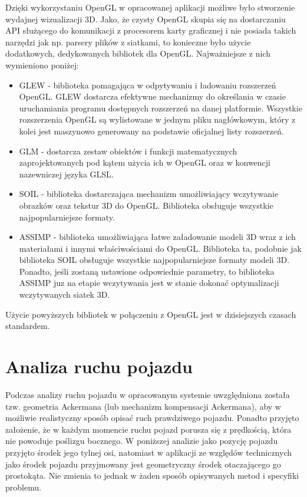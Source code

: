 \documentclass[a4paper,11pt,twoside]{report}
\theoremstyle{definition}
\begin{document}
Dzięki wykorzystaniu OpenGL w opracowanej aplikacji możliwe było stworzenie wydajnej wizualizacji 3D. Jako, że czysty OpenGL skupia się na dostarczaniu API służącego do komunikacji z procesorem karty graficznej i nie posiada takich narzędzi jak np. parsery plików z siatkami, to konieczne było użycie dodatkowych, dedykowanych bibliotek dla OpenGL. Najważniejsze z nich wymieniono poniżej:
\begin{itemize}
	\item GLEW - biblioteka pomagająca w odpytywaniu i ładowaniu rozszerzeń OpenGL. GLEW dostarcza efektywne mechanizmy do określania w czasie uruchamiania programu dostępnych rozszerzeń na danej platformie. Wszystkie rozszerzenia OpenGL są wylistowane w jednym pliku nagłówkowym, który z kolei jest maszynowo generowany na podstawie oficjalnej listy rozszerzeń.
	\item GLM - dostarcza zestaw obiektów i funkcji matematycznych zaprojektowanych pod kątem użycia ich w OpenGL oraz w konwencji nazewniczej języka GLSL.
	\item SOIL - biblioteka dostarczająca mechanizm umożliwiający wczytywanie obrazków oraz tekstur 3D do OpenGL. Biblioteka obsługuje wszystkie najpopularniejsze formaty.
	\item ASSIMP - biblioteka umożliwiająca łatwe załadowanie modeli 3D wraz z ich materiałami i innymi właściwościami do OpenGL. Biblioteka ta, podobnie jak biblioteka SOIL obsługuje wszystkie najpopularniejsze formaty modeli 3D. Ponadto, jeśli zostaną ustawione odpowiednie parametry, to biblioteka ASSIMP juz na etapie wczytywania jest w stanie dokonać optymalizacji wczytywanych siatek 3D.
\end{itemize}

Użycie powyższych bibliotek w połączeniu z OpenGL jest w dzisiejszych czasach standardem.

\chapter{Analiza ruchu pojazdu}

Podczas analizy ruchu pojazdu w opracowanym systemie uwzględniona została tzw. geometria Ackermana (lub mechanizm kompensacji Ackermana), aby w możliwie realistyczny sposób opisać ruch prawdziwego pojazdu. Ponadto przyjęto założenie, że w każdym momencie ruchu pojazd porusza się z prędkością, która nie powoduje poślizgu bocznego. W poniższej analizie jako pozycję pojazdu przyjęto środek jego tylnej osi, natomiast w aplikacji ze względów technicznych jako środek pojazdu przyjmowany jest geometryczny środek otaczającego go prostokąta. Nie zmienia to jednak w żaden sposób opisywanych metod i specyfiki problemu.
\end{document}
